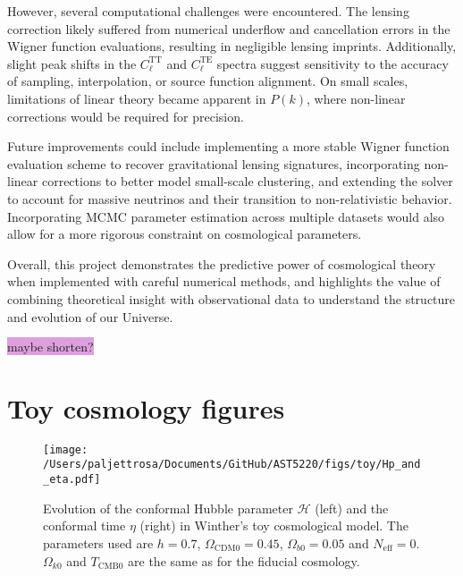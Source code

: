 \documentclass{aa}
\numberwithin{equation}{section}
\numberwithin{table}{section}
\numberwithin{figure}{section}
\begin{document}
However, several computational challenges were encountered. The lensing correction likely suffered from numerical underflow and cancellation errors in the Wigner function evaluations, resulting in negligible lensing imprints. Additionally, slight peak shifts in the $C_\ell^{\text{TT}}$ and $C_\ell^{\text{TE}}$ spectra suggest sensitivity to the accuracy of sampling, interpolation, or source function alignment. On small scales, limitations of linear theory became apparent in $P(k)$, where non-linear corrections would be required for precision.

Future improvements could include implementing a more stable Wigner function evaluation scheme to recover gravitational lensing signatures, incorporating non-linear corrections to better model small-scale clustering, and extending the solver to account for massive neutrinos and their transition to non-relativistic behavior. Incorporating MCMC parameter estimation across multiple datasets would also allow for a more rigorous constraint on cosmological parameters.

Overall, this project demonstrates the predictive power of cosmological theory when implemented with careful numerical methods, and highlights the value of combining theoretical insight with observational data to understand the structure and evolution of our Universe.

\colorbox{Plum}{maybe shorten?}


\appendix

\onecolumn

\section{Toy cosmology figures}\label{appsec: figures}
\begin{figure}[h!]
  \centering
  \texttt{[image: /Users/paljettrosa/Documents/GitHub/AST5220/figs/toy/Hp\_and\_eta.pdf]}
  \caption{Evolution of the conformal Hubble parameter $\mathcal{H}$ (left) and the conformal time $\eta$ (right) in Winther's toy cosmological model. The parameters used are $h=0.7$, $\Omega_{\text{CDM}0}=0.45$, $\Omega_{b0}=0.05$ and $N_\text{eff}=0$. $\Omega_{k0}$ and $T_\text{CMB0}$ are the same as for the fiducial cosmology.}\label{appfig: Hp_and_eta}
  \vspace{-15pt}
\end{figure}
\end{document}
